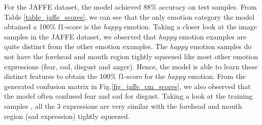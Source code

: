 \documentclass[master]{thesis-uestc}
\begin{document}
For the JAFFE dataset, the model achieved 88\% accuracy on test samples. From Table \ref{table_jaffe_scores}, we can see that the only emotion category the model obtained a 100\% f1-score is the \textit{happy} emotion. Taking a closer look at the image samples in the JAFFE dataset, we observed that \textit{happy} emotion examples are quite distinct from the other emotion examples. The \textit{happy} emotion samples do not have the forehead and mouth region tightly squeezed like most other emotion expressions (fear, sad, disgust and anger). Hence, the model is able to learn these distinct features to obtain the 100\% f1-score for the \textit{happy} emotion. From the generated confusion matrix in Fig.\ref{fig_jaffe_cm_scores}, we also observed that the model often confused fear and sad for disgust. Taking a look at the training samples , all the 3 expressions are very similar with the forehead and mouth region (sad expression) tightly squeezed. 


\end{document}
